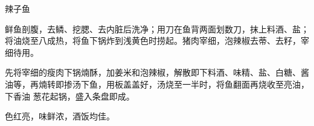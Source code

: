 %
%
%
%
%
%
%
\begin{recipe}{辣子鱼}

\ingredients


\preparation

\step 鲜鱼剖腹，去鳞、挖腮、去内脏后洗净；用刀在鱼背两面划数刀，抹上料酒、盐；
将油烧至八成热，将鱼下锅炸到浅黄色时捞起。猪肉宰细，泡辣椒去蒂、去籽，宰细待用。

\step 先将宰细的瘦肉下锅煵酥，加姜米和泡辣椒，解散即下料酒、味精、盐、白糖、酱
油等，再煵转即掺汤下鱼，用板盖盖好，汤烧至一半时，将鱼翻面再烧收至亮油，下香油
葱花起锅，盛入条盘即成。

\features

色红亮，味鲜浓，酒饭均佳。

\end{recipe}

